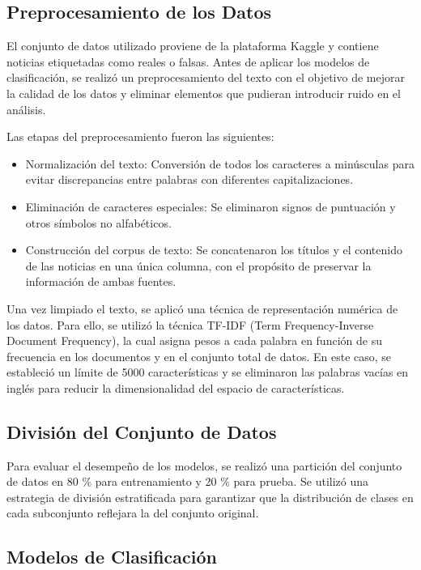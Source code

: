 \documentclass[journal]{IEEEtran}
\begin{document}
\subsection{Preprocesamiento de los Datos}

El conjunto de datos utilizado proviene de la plataforma Kaggle y contiene noticias etiquetadas como reales o falsas. Antes de aplicar los modelos de clasificación, se realizó un preprocesamiento del texto con el objetivo de mejorar la calidad de los datos y eliminar elementos que pudieran introducir ruido en el análisis.

Las etapas del preprocesamiento fueron las siguientes:
\begin{itemize}
    \item Normalización del texto: Conversión de todos los caracteres a minúsculas para evitar discrepancias entre palabras con diferentes capitalizaciones.
    \item Eliminación de caracteres especiales: Se eliminaron signos de puntuación y otros símbolos no alfabéticos.
    \item Construcción del corpus de texto: Se concatenaron los títulos y el contenido de las noticias en una única columna, con el propósito de preservar la información de ambas fuentes.
\end{itemize}

Una vez limpiado el texto, se aplicó una técnica de representación numérica de los datos. Para ello, se utilizó la técnica TF-IDF (Term Frequency-Inverse Document Frequency), la cual asigna pesos a cada palabra en función de su frecuencia en los documentos y en el conjunto total de datos. En este caso, se estableció un límite de 5000 características y se eliminaron las palabras vacías en inglés para reducir la dimensionalidad del espacio de características.

\subsection{División del Conjunto de Datos}

Para evaluar el desempeño de los modelos, se realizó una partición del conjunto de datos en 80 \% para entrenamiento y 20 \% para prueba. Se utilizó una estrategia de división estratificada para garantizar que la distribución de clases en cada subconjunto reflejara la del conjunto original.

\subsection{Modelos de Clasificación}
\end{document}
